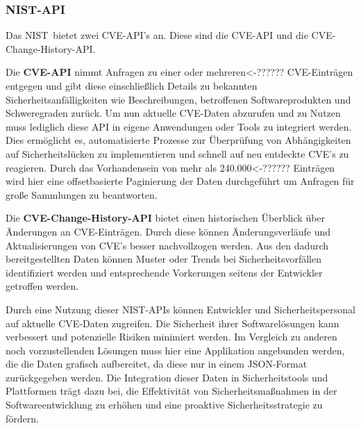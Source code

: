 \subsubsection{NIST-API} \label{sec:NIST-API}
Das \glqq \ac{NIST}\grqq~bietet zwei \ac{CVE}-\ac{API}'s an.
Diese sind die \ac{CVE}-\ac{API} und die \ac{CVE}-Change-History-\ac{API}.

Die \textbf{\ac{CVE}-\ac{API}} nimmt Anfragen zu einer oder mehreren<-?????? \ac{CVE}-Einträgen entgegen und gibt diese einschließlich Details zu bekannten Sicherheitsanfälligkeiten wie Beschreibungen, betroffenen Softwareprodukten und Schweregraden zurück.
Um nun aktuelle \ac{CVE}-Daten abzurufen und zu Nutzen muss lediglich diese \ac{API} in eigene Anwendungen oder Tools zu integriert werden.
Dies ermöglicht es, automatisierte Prozesse zur Überprüfung von Abhängigkeiten auf Sicherheitslücken zu implementieren und schnell auf neu entdeckte \ac{CVE}'s zu reagieren.
Durch das Vorhandensein von mehr als 240.000<-?????? Einträgen wird hier eine offsetbasierte Paginierung der Daten durchgeführt um Anfragen für große Sammlungen zu beantworten.

Die \textbf{\ac{CVE}-Change-History-\ac{API}} bietet einen historischen Überblick über Änderungen an \ac{CVE}-Einträgen.
Durch diese können Änderungsverläufe und Aktualisierungen von \ac{CVE}'s besser nachvollzogen werden.
Aus den dadurch bereitgestellten Daten können Muster oder Trends bei Sicherheitsvorfällen identifiziert werden und entsprechende Vorkerungen seitens der Entwickler getroffen werden.

Durch eine Nutzung dieser \ac{NIST}-\ac{API}s können Entwickler und Sicherheitspersonal auf aktuelle \ac{CVE}-Daten zugreifen.
Die Sicherheit ihrer Softwarelösungen kann verbessert und potenzielle Risiken minimiert werden.
Im Vergleich zu anderen noch vorzustellenden Lösungen muss hier eine Applikation angebunden werden, die die Daten grafisch aufbereitet, da diese nur in einem JSON-Format zurückgegeben werden. 
Die Integration dieser Daten in Sicherheitstools und Plattformen trägt dazu bei, die Effektivität von Sicherheitsmaßnahmen in der Softwareentwicklung zu erhöhen und eine proaktive Sicherheitsstrategie zu fördern.



